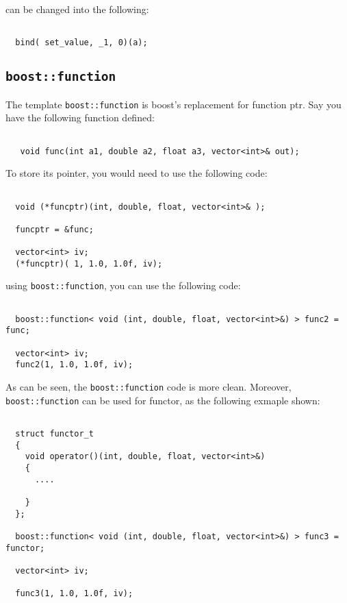\documentclass[letterpaper]{book}
\begin{document}
can be changed into the following:

\begin{lstlisting}

  bind( set_value, _1, 0)(a);

\end{lstlisting}

\subsection{\lstinline$boost::function$}

  The template \lstinline$boost::function$ is boost's replacement for function ptr. Say you have
the following function defined:

\begin{lstlisting}

   void func(int a1, double a2, float a3, vector<int>& out);

\end{lstlisting}

  To store its pointer, you would need to use the following code:

\begin{lstlisting}

  void (*funcptr)(int, double, float, vector<int>& );

  funcptr = &func;

  vector<int> iv;
  (*funcptr)( 1, 1.0, 1.0f, iv);

\end{lstlisting}

using \lstinline$boost::function$, you can use the following code:

\begin{lstlisting}

  boost::function< void (int, double, float, vector<int>&) > func2 = func;

  vector<int> iv;
  func2(1, 1.0, 1.0f, iv);

\end{lstlisting}

As can be seen, the \lstinline$boost::function$ code is more clean. Moreover, \lstinline$boost::function$
can be used for functor, as the following exmaple shown:

\begin{lstlisting}

  struct functor_t
  {
    void operator()(int, double, float, vector<int>&)
    {
      ....

    }
  };

  boost::function< void (int, double, float, vector<int>&) > func3 = functor;

  vector<int> iv;

  func3(1, 1.0, 1.0f, iv);

\end{lstlisting}
\end{document}
